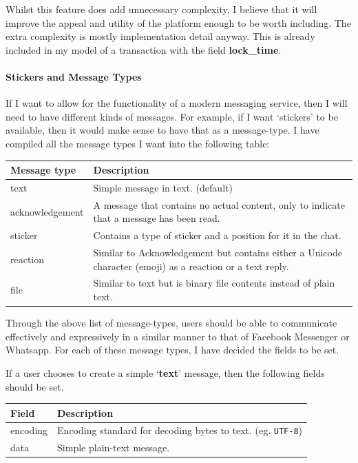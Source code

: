 \documentclass{article}
\begin{document}
Whilst this feature does add unnecessary complexity, I believe that it will improve the appeal and utility of the platform enough to be worth including. The extra complexity is mostly implementation detail anyway. This is already included in my model of a transaction with the field \textbf{lock\_time}.

\paragraph{Stickers and Message Types}
If I want to allow for the functionality of a modern messaging service, then I will need to have different kinds of messages. For example, if I want `stickers' to be available, then it would make sense to have that as a message-type. I have compiled all the message types I want into the following table:
\begin{table}[H]
\centering
\begin{tabular}{|p{3cm}|p{8.5cm}|}
\hline
\rowcolor{tblgrey} 
Message type    & Description                                                                               \\ \hline
text            & Simple message in text. (default)                                                         \\ \hline
acknowledgement & A message that contains no actual content, only to indicate that a message has been read. \\ \hline
sticker         & Contains a type of sticker and a position for it in the chat.                                        \\ \hline
reaction        & Similar to Acknowledgement but contains either a Unicode character (emoji) as a reaction or a text reply. \\ \hline
file            & Similar to text but is binary file contents instead of plain text.                       \\ \hline
\end{tabular}
\end{table}

Through the above list of message-types, users should be able to communicate effectively and expressively in a similar manner to that of Facebook Messenger or Whatsapp. For each of these message types, I have decided the fields to be set.

If a user chooses to create a simple `\textbf{text}' message, then the following fields should be set.
\begin{table}[H]
\centering
\begin{tabular}{|p{2.5cm}|p{8.5cm}|}
\hline
\rowcolor{tblgrey} 
Field           & Description                                               \\ \hline
encoding        & Encoding standard for decoding bytes to text. (eg. \texttt{UTF-8}) \\ \hline
data            & Simple plain-text message.                                \\ \hline
\end{tabular}
\end{table}
\end{document}
